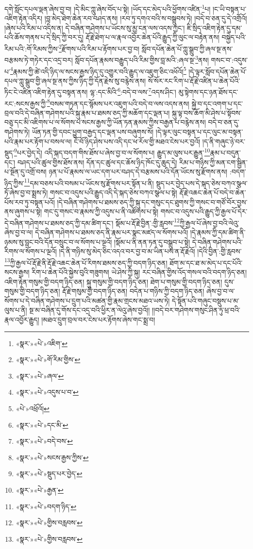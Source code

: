 དགེ་སློང་དཔལ་ལྡན་ཞེས་བྱ་བ། །དེ་མིང་ཀླུ་ཞེས་བོད་པ་སྟེ། །ཡོད་དང་མེད་པའི་ཕྱོགས་འཛིན་\footnote{«སྣར་»«པེ་»འཇིག་}པ། །ང་ཡི་བསྟན་པ་འཇིག་རྟེན་འདིར། །བླ་མེད་ཐེག་ཆེན་རབ་བཤད་ནས། །རབ་ཏུ་དགའ་བའི་ས་བསྒྲུབས་ཏེ། །བདེ་བ་ཅན་དུ་དེ་འགྲོའོ། །ཞེས་པའི་རིམ་པ་འདིས་ན། དེ་བཞིན་གཤེགས་པ་ཡོངས་སུ་མྱ་ངན་ལས་འདས་ཀྱང་། ཇི་སྲིད་འཇིག་རྟེན་དུ་དམ་པའི་ཆོས་གནས་པ་དེ་སྲིད་ཀྱི་བར་དུ། རྡོ་རྗེ་ཐེག་པ་ལ་རྣལ་འབྱོར་ཆེན་པོའི་རྒྱུད་ཀྱི་ལུང་ལ་བརྟེན་ནས། བསྐྱེད་པའི་རིམ་པའི་:གོ་རིམས་ཀྱིས་\footnote{«སྣར་»«པེ་»གོ་རིམ་གྱིས་}རྫོགས་པའི་རིམ་པ་རྟོགས་པར་བྱ་བ། སློབ་དཔོན་ཆེན་པོ་ཀླུ་སྒྲུབ་ཀྱི་ཞལ་སྔ་ནས་བརྩམས་ཏེ་གཏེར་དང་འདྲ་བར། སློབ་དཔོན་རྣམས་བརྒྱུད་པའི་རིམ་གྱིས་བླ་མའི་:ཞལ་སྔ་\footnote{«སྣར་»«པེ་»ཞལ་}ནས། གསང་བ་:འདུས་པ་\footnote{«སྣར་»«པེ་»འདུས་པ་བ་}རྣམས་ཀྱི་ཚེ་འདི་ཉིད་ལ་སངས་རྒྱས་ཉིད་དུ་འགྱུར་བའི་རྒྱུད་ལ་འཇུག་ཅིང་འཕོའོ།\footnote{«པེ་»འཕྲོའོ།} །དེ་ལྟར་སློབ་དཔོན་ཆེན་པོ་དཔལ་ཀླུ་སྒྲུབ་གྱི་ཞལ་སྔ་ནས་ཀྱིས་ཉིད་ཀྱི་དོན་རྗེས་སུ་བརྙེས་ནས། སོ་སོར་རང་རིག་པ་རྡོ་རྗེ་འཛིན་པ་ཆེན་པོའི་ཏིང་ངེ་འཛིན་འཇིག་རྟེན་དུ་བསྟན་ནས། ལྷ་:དང་མིའི་\footnote{«སྣར་»«པེ་»དང་མི་}:བདེ་བ་ལས་\footnote{«སྣར་»«པེ་»བདེ་བས་}འདས་ཤིང་། མུ་སྟེགས་དང་ཉན་ཐོས་དང་རང་:སངས་རྒྱས་ཀྱི་\footnote{«སྣར་»«པེ་»སངས་རྒྱས་ཀྱིས་}བསམ་གཏན་དང་སྙོམས་པར་འཇུག་པའི་བདེ་བ་ལས་འདས་ནས། སྐྱེ་བ་དང་འགག་པ་དང་བྲལ་བའི་དེ་བཞིན་གཤེགས་པའི་སྐུ་རྣམ་པ་ཐམས་ཅད་ཀྱི་མཆོག་དང་ལྡན་པ། སྐུ་ལྟ་བས་ཆོག་མི་ཤེས་པ་སྟོབས་བཅུ་དང་མི་འཇིགས་པ་ལ་སོགས་པ་སངས་རྒྱས་ཀྱི་ཡོན་ཏན་རྣམས་ཀྱིས་བརྒྱན་པ་བརྙེས་ནས། བདེ་བ་ཅན་དུ་གཤེགས་ཏེ། ཡོན་ཏན་གྱི་དབང་ཕྱུག་བརྒྱད་དང་ལྡན་པས་བཞུགས་སོ། །དེ་ལྟར་ལུང་བསྟན་པ་དང་ལུང་མ་བསྟན་པའི་རྣམ་པར་རྟོག་པ་བསལ་ལ། ངོ་བོ་ཉིད་ཤེས་པས་འདི་དང་ཕ་རོལ་གྱི་མཐའ་ངེས་པར་བྱའོ། །ད་ནི་གཞུང་ཉེ་བར་སྡུད་\footnote{«སྣར་»«པེ་»སྡུད་པར་བྱེད་}པར་བྱེད་དེ། འདི་སྐད་བདག་གིས་ཐོས་པ་ཞེས་བྱ་བ་ལ་སོགས་པ། རྒྱུད་མ་ལུས་པར་རྒྱུན་\footnote{«སྣར་»«པེ་»རྒྱན་}རྣམ་པ་བདུན་དང་། བཤད་པའི་ཚུལ་གྱིས་ཐོས་ནས། དོན་དང་ཚུལ་དང་ཆོས་ཉིད་ཁོང་དུ་ཆུད་དེ། རིམ་པ་གཉིས་ཀྱི་མན་ངག་སྦྱིན་པ་སྔོན་དུ་འགྲོ་བས། ཉན་པ་པོ་རྣམས་ལ་ཡང་དག་པར་བཤད་དེ་བརྩམས་པའི་དོན་ཡོངས་སུ་རྫོགས་ནས། :བདག་ཉིད་ཀྱིས་\footnote{«སྣར་»«པེ་»བདག་ཉིད་}དམ་བཅས་པའི་བསམ་པ་ཡོངས་སུ་རྫོགས་པར་སྟོན་པ་ནི། སྡུད་པར་བྱེད་པས་དེ་སྐད་ཅེས་བཀའ་སྩལ་ཏོ་ཞེས་བྱ་བ་སྨྲས་ཏེ། གསང་བ་འདུས་པའི་རྒྱུད་འདི་དེ་སྐད་ཅེས་བཀའ་སྩལ་པ་སྟེ། རྡོ་རྗེ་འཆང་ཆེན་པོ་བདེ་བ་ཆེན་པོས་རབ་ཏུ་བསྟན་པའོ། །དེ་བཞིན་གཤེགས་པ་ཐམས་ཅད་ཀྱི་སྐུ་དང་གསུང་དང་ཐུགས་ཀྱི་གསང་བ་གཙོ་བོར་བྱས་ནས་ཞུགས་པ་སྟེ། གང་དུ་གསང་བ་རྣམས་ཀྱི་འདུས་པ་ནི་འཚོགས་པ་སྟེ། གསང་བ་འདུས་པའི་རྒྱུད་ཀྱི་རྒྱལ་པོ་དེར་དེ་བཞིན་གཤེགས་པ་ཐམས་ཅད་ཀྱི་དམ་ཚིག་དང་། སྡོམ་པ་རྡོ་རྗེ་བྱིན་:གྱི་རླབས་\footnote{«སྣར་»«པེ་»གྱིས་བརླབས་}ཀྱི་རྒྱལ་པོ་ཞེས་བྱ་བའི་ལེའུ་ཞེས་བྱ་བ་ལ། དེ་བཞིན་གཤེགས་པ་ཐམས་ཅད་ནི་རྣམ་པར་སྣང་མཛད་ལ་སོགས་པའོ། །དེ་རྣམས་ཀྱི་དམ་ཚིག་ནི་ཉམས་སུ་བླང་བའི་དོན་བསྲུང་བ་ལ་སོགས་པ་ལྔའོ། །སྡོམ་པ་ནི་ནན་ཏན་དུ་བསྒྲུབ་པ་སྟེ། དེ་བཞིན་གཤེགས་པའི་རིགས་ལ་སོགས་པ་ལྔའོ། །དེ་ནི་གཉིས་སུ་མེད་ཅིང་འདའ་བར་བྱ་བ་མ་ཡིན་པས་ན་རྡོ་རྗེའོ། །དེའི་བྱིན་:གྱི་རླབས་\footnote{«སྣར་»«པེ་»གྱིས་བརླབས་}ཀྱི་རྒྱལ་པོ་རྡོ་རྗེ་ནི་རྡོ་རྗེ་འཆང་ཆེན་པོ་རིགས་ཐམས་ཅད་ཀྱི་བདག་ཉིད་ཅན། ཐོག་མ་དང་ཐ་མ་མེད་པ་དང་པོའི་སངས་རྒྱས། རིག་པ་ཆེན་པོའི་སྐྱེས་བུའི་གཟུགས། ཡེ་ཤེས་ཀྱི་སྐུ། རང་བཞིན་གྱིས་འོད་གསལ་བའི་བདག་ཉིད་ཅན། འཇིག་རྟེན་གསུམ་གྱི་བདག་ཉིད་ཅན། སྐུ་གསུམ་གྱི་བདག་ཉིད་ཅན། ཐེག་པ་གསུམ་གྱི་བདག་ཉིད་ཅན། དུས་གསུམ་གྱི་བདག་ཉིད་ཅན། རྡོ་རྗེ་གསུམ་གྱི་བདག་ཉིད་ཅན། བདེན་པ་གཉིས་ཀྱི་བདག་ཉིད་ཅན། ཞེས་བྱ་བ་ལ་སོགས་པ་དེ་བཞིན་གཤེགས་པ་དྲུག་པའི་མཚན་གྱི་རྣམ་གྲངས་མཐའ་ཡས་ཏེ། དེ་སྟོན་པའི་གཞུང་བསྡུས་པ་མ་ལུས་པ་ནི། སྔ་མ་བཞིན་དུ་གོས་དང་འདྲ་བའི་ཕྱིར་ན་ལེའུ་ཞེས་བྱའོ།། །།བདེ་བར་གཤེགས་གསུང་ཤིན་ཏུ་ཕྲ་བའི་རྣལ་འབྱོར་རྒྱུད། །མཐའ་དྲུག་བྲལ་བར་ངེས་པར་རྟོགས་ཞེས་གང་སྨྲ་བ། 
